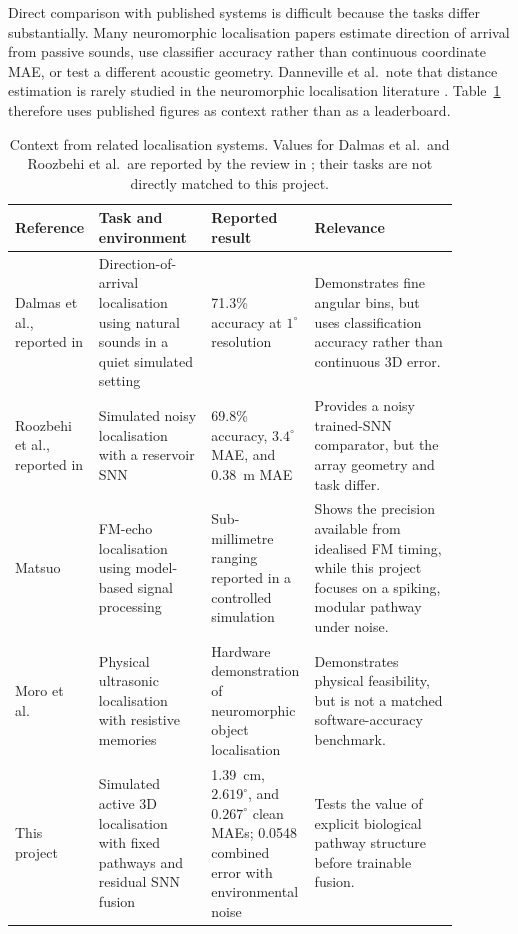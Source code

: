 Direct comparison with published systems is difficult because the tasks differ substantially. Many neuromorphic localisation papers estimate direction of arrival from passive sounds, use classifier accuracy rather than continuous coordinate MAE, or test a different acoustic geometry. Danneville et al.\ note that distance estimation is rarely studied in the neuromorphic localisation literature \cite{Danneville2024ASystems}. Table~\ref{tab:literature_context} therefore uses published figures as context rather than as a leaderboard.

\begin{table}[h]
    \centering
    \caption{Context from related localisation systems. Values for Dalmas et al.\ and Roozbehi et al.\ are reported by the review in \cite{Danneville2024ASystems}; their tasks are not directly matched to this project.}
    \label{tab:literature_context}
    \small
    \begin{tabular}{p{0.1\linewidth}p{0.25\linewidth}p{0.21\linewidth}p{0.32\linewidth}}
        \toprule
        Reference & Task and environment & Reported result & Relevance \\
        \midrule
        Dalmas et al., reported in \cite{Danneville2024ASystems} & Direction-of-arrival localisation using natural sounds in a quiet simulated setting & 71.3\% accuracy at $1^\circ$ resolution & Demonstrates fine angular bins, but uses classification accuracy rather than continuous 3D error. \\
        \midrule
        Roozbehi et al., reported in \cite{Danneville2024ASystems} & Simulated noisy localisation with a reservoir SNN & 69.8\% accuracy, $3.4^\circ$ MAE, and 0.38~m MAE & Provides a noisy trained-SNN comparator, but the array geometry and task differ. \\
        \midrule
        Matsuo \cite{Matsuo2013EcholocationSound} & FM-echo localisation using model-based signal processing & Sub-millimetre ranging reported in a controlled simulation & Shows the precision available from idealised FM timing, while this project focuses on a spiking, modular pathway under noise. \\
        \midrule
        Moro et al.\ \cite{Moro2022NeuromorphicTransducers} & Physical ultrasonic localisation with resistive memories & Hardware demonstration of neuromorphic object localisation & Demonstrates physical feasibility, but is not a matched software-accuracy benchmark. \\
        \midrule
        This project & Simulated active 3D localisation with fixed pathways and residual SNN fusion & 1.39~cm, $2.619^\circ$, and $0.267^\circ$ clean MAEs; 0.0548 combined error with environmental noise & Tests the value of explicit biological pathway structure before trainable fusion. \\
        \bottomrule
    \end{tabular}
\end{table}

